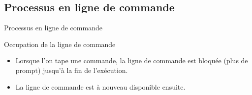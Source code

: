 \subsection{Processus en ligne de commande}
\begin{frame}{Processus en ligne de commande}
  \begin{block}{Occupation de la ligne de commande}
    \begin{itemize}
    \item Lorsque l'on tape une commande, la ligne de commande est
      bloquée (plus de prompt) jusqu'à la fin de l'exécution.
    \item La ligne de commande est à nouveau disponible ensuite.
    \end{itemize}
    \begin{center}
       
    \end{center}
  \end{block}
\end{frame}

